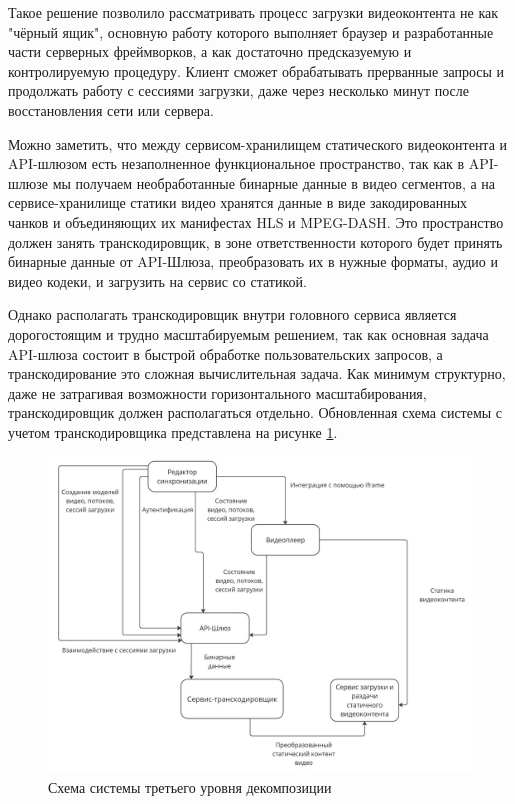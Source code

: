 	Такое решение позволило рассматривать процесс загрузки видеоконтента не как "чёрный ящик", основную работу которого выполняет браузер и разработанные части серверных фреймворков, а как достаточно предсказуемую и контролируемую процедуру. Клиент сможет обрабатывать прерванные запросы и продолжать работу с сессиями загрузки, даже через несколько минут после восстановления сети или сервера.

	Можно заметить, что между сервисом-хранилищем статического видеоконтента и API-шлюзом есть незаполненное функциональное пространство, так как в API-шлюзе мы получаем необработанные бинарные данные в видео сегментов, а на сервисе-хранилище статики видео хранятся данные в виде закодированных чанков и объединяющих их манифестах HLS и MPEG-DASH. Это пространство должен занять транскодировщик, в зоне ответственности которого будет принять бинарные данные от API-Шлюза, преобразовать их в нужные форматы, аудио и видео кодеки, и загрузить на сервис со статикой.

	Однако располагать транскодировщик внутри головного сервиса является дорогостоящим и трудно масштабируемым решением, так как основная задача API-шлюза состоит в быстрой обработке пользовательских запросов, а транскодирование это сложная вычислительная задача. Как минимум структурно, даже не затрагивая возможности горизонтального масштабирования, транскодировщик должен располагаться отдельно. Обновленная схема системы с учетом транскодировщика представлена на рисунке \ref{fig:system_scheme_3}.
	\begin{figure}[ht!] 
		\center
		\includegraphics [scale=0.37] {my_folder/images//system_scheme_3}
		\caption{Схема системы третьего уровня декомпозиции} 
		\label{fig:system_scheme_3}  
	\end{figure}


